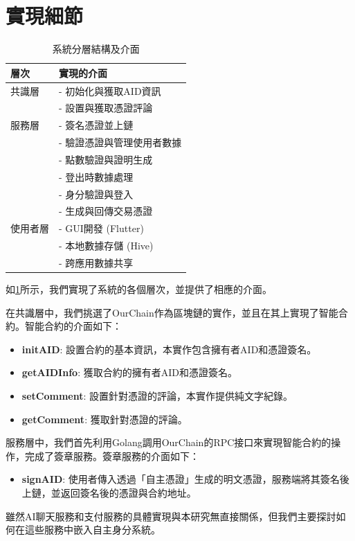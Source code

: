 \section{實現細節}
\begin{table}[htbp]
  \centering
  \caption{系統分層結構及介面}
  \label{tab:system-interfaces}
  \begin{tabularx}{\textwidth}{|l|X|}
    \hline
    \textbf{層次} & \textbf{實現的介面}    \\
    \hline
    共識層         & - 初始化與獲取AID資訊     \\
                & - 設置與獲取憑證評論       \\
    \hline
    服務層         & - 簽名憑證並上鏈         \\
                & - 驗證憑證與管理使用者數據    \\
                & - 點數驗證與證明生成       \\
                & - 登出時數據處理         \\
                & - 身分驗證與登入         \\
                & - 生成與回傳交易憑證       \\
    \hline
    使用者層        & - GUI開發 (Flutter) \\
                & - 本地數據存儲 (Hive)   \\
                & - 跨應用數據共享         \\
    \hline
  \end{tabularx}
\end{table}
如\ref{tab:system-interfaces}所示，我們實現了系統的各個層次，並提供了相應的介面。

在共識層中，我們挑選了OurChain\cite{ourlab408_ourchain}作為區塊鏈的實作，並且在其上實現了智能合約。智能合約的介面如下：
\begin{itemize}
  \item \textbf{initAID}: 設置合約的基本資訊，本實作包含擁有者AID和憑證簽名。
  \item \textbf{getAIDInfo}: 獲取合約的擁有者AID和憑證簽名。
  \item \textbf{setComment}: 設置針對憑證的評論，本實作提供純文字紀錄。
  \item \textbf{getComment}: 獲取針對憑證的評論。
\end{itemize}
服務層中，我們首先利用Golang調用OurChain的RPC接口來實現智能合約的操作，完成了簽章服務。簽章服務的介面如下：
\begin{itemize}
  \item \textbf{signAID}: 使用者傳入透過「自主憑證」生成的明文憑證，服務端將其簽名後上鏈，並返回簽名後的憑證與合約地址。
\end{itemize}
雖然AI聊天服務和支付服務的具體實現與本研究無直接關係，但我們主要探討如何在這些服務中嵌入自主身分系統。

